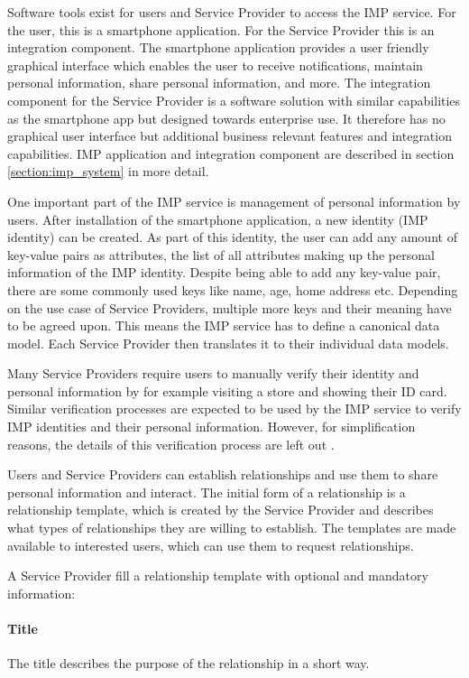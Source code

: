 Software tools exist for users and Service Provider to access the IMP service. 
For the user, this is a smartphone application. For the Service Provider this is an integration component. The smartphone application provides a user friendly graphical interface which enables the user to receive notifications, maintain personal information, share personal information, and more. The integration component for the Service Provider is a software solution with similar capabilities as the smartphone app but designed towards enterprise use. It therefore has no graphical user interface but additional business relevant features and integration capabilities. IMP application and integration component are described in section \ref{section:imp_system} in more detail.

One important part of the IMP service is management of personal information by users. After installation of the smartphone application, a new identity (IMP identity) can be created. As part of this identity, the user can add any amount of key-value pairs as attributes, the list of all attributes making up the personal information of the IMP identity. Despite being able to add any key-value pair, there are some commonly used keys like name, age, home address etc. Depending on the use case of Service Providers, multiple more keys and their meaning have to be agreed upon. This means the IMP service has to define a canonical data model. Each Service Provider then translates it to their individual data models.

Many Service Providers require users to manually verify their identity and personal information by for example visiting a store and showing their ID card. Similar verification processes are expected to be used by the IMP service to verify IMP identities and their personal information. However, for simplification reasons, the details of this verification process are left out .

Users and Service Providers can establish relationships and use them to share personal information and interact. The initial form of a relationship is a relationship template, which is created by the Service Provider and describes what types of relationships they are willing to establish. The templates are made available to interested users, which can use them to request relationships.

A Service Provider fill a relationship template with optional and mandatory information:

\paragraph{Title} The title describes the purpose of the relationship in a short way. 
    
